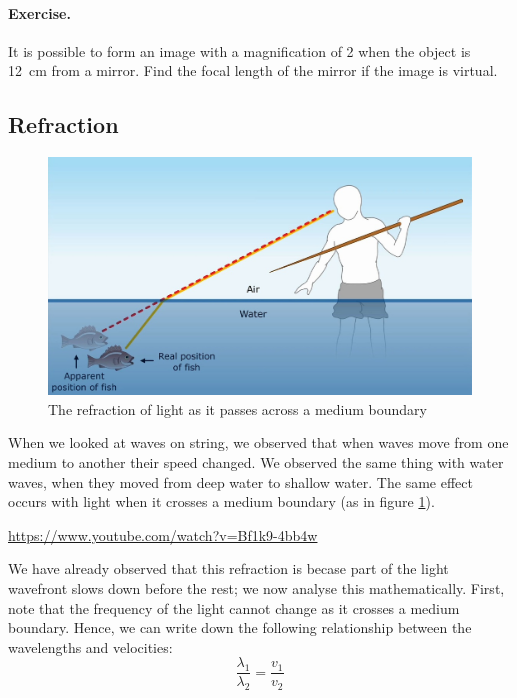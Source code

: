 \documentclass[a4paper]{amsbook}
\newcommand\capcite[1]{}
\begin{document}
\paragraph{Exercise.} It is possible to form an image with a magnification of 2 when the object is \SI{12}{\centi\metre}
from a mirror. Find the focal length of the mirror if the image is virtual.

\subsection{Refraction}
\begin{figure}
  \centering
  \includegraphics[width=\textwidth]{lightrefraction}
  \caption{The refraction of light as it passes across a medium boundary \capcite{http://munnscience.weebly.com/uploads/3/8/0/6/38066171/158235059.jpg}\label{fig:lightrefracts}}
\end{figure}
When we looked at waves on string, we observed that when waves move from one medium to another their speed changed. We observed
the same thing with water waves, when they moved from deep water to shallow water. The same effect occurs with light when it
crosses a medium boundary (as in figure \ref{fig:lightrefracts}).

\begin{center}
\begin{tcolorbox}[width=0.8\textwidth,colback={red},title={\textbf{Go and watch...}},colbacktitle=yellow,coltitle=blue]
  \textcolor{white}{\url{https://www.youtube.com/watch?v=Bf1k9-4bb4w}}
\end{tcolorbox}
\end{center}

We have already observed that this refraction is becase part of the light wavefront slows down before the rest; we now analyse
this mathematically. First, note that the frequency of the light cannot change as it crosses a medium boundary. Hence, we
can write down the following relationship between the wavelengths and velocities:
\begin{displaymath}
  \frac{\lambda_1}{\lambda_2} = \frac{v_1}{v_2}
\end{displaymath}
\end{document}

